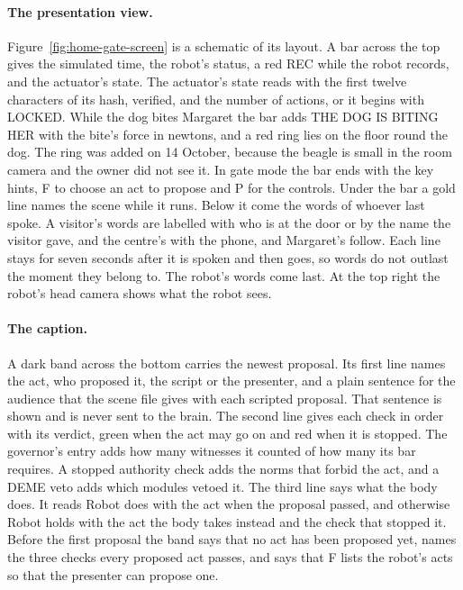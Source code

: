 \paragraph{The presentation view.}
Figure~\ref{fig:home-gate-screen} is a schematic of its layout. A bar across the top gives the
simulated time, the robot's status, a red REC while the robot records, and the actuator's state. The
actuator's state reads  with the first twelve characters of its hash, verified, and
the number of actions, or it begins with LOCKED. While the dog bites Margaret the bar adds THE DOG
IS BITING HER with the bite's force in newtons, and a red ring lies on the floor round the dog. The
ring was added on 14 October, because the beagle is small in the room camera and the owner did not
see it. In gate mode the bar ends with the key hints, F to choose an act to propose and P for the
controls. Under the bar a gold line names the scene while it runs. Below it come the words of
whoever last spoke. A visitor's words are labelled with who is at the door or by the name the
visitor gave, and the centre's with the phone, and Margaret's follow. Each line stays for seven
seconds after it is spoken and then goes, so words do not outlast the moment they belong to. The
robot's words come last. At the top right the robot's head camera shows what the robot sees.

\paragraph{The caption.}
A dark band across the bottom carries the newest proposal. Its first line names the act, who
proposed it, the script or the presenter, and a plain sentence for the audience that the scene
file gives with each scripted proposal. That sentence is shown and is never sent to the brain. The
second line gives each check
in order with its verdict, green when the act may go on and red when it is stopped. The governor's
entry adds how many witnesses it counted of how many its bar requires. A stopped authority check
adds the norms that forbid the act, and a DEME veto adds which modules vetoed it. The third line
says what the body does. It reads Robot does with the act when the proposal passed, and otherwise
Robot holds with the act the body takes instead and the check that stopped it. Before the first
proposal the band says that no act has been proposed yet, names the three checks every proposed
act passes, and says that F lists the robot's acts so that the presenter can propose one.

